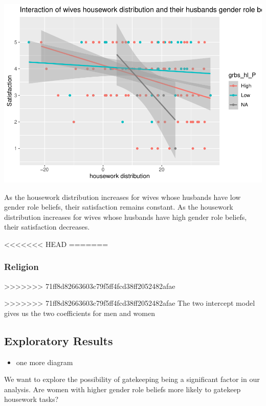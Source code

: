\documentclass[
  man,floatsintext]{apa6}
\providecommand{\tightlist}{%
  \setlength{\itemsep}{0pt}\setlength{\parskip}{0pt}}
\begin{document}
\includegraphics{results_files/figure-latex/unnamed-chunk-10-1.pdf}

As the housework distribution increases for wives whose husbands have low gender role beliefs, their satisfaction remains constant. As the housework distribution increases for wives whose husbands have high gender role beliefs, their satisfaction decreases.

<<<<<<< HEAD
=======
\hypertarget{religion}{%
\subsubsection{Religion}\label{religion}}
>>>>>>> 71ff8d82663603c79f5ff4fcd38ff2052482afae

>>>>>>> 71ff8d82663603c79f5ff4fcd38ff2052482afae
The two intercept model gives us the two coefficients for men and women

\hypertarget{exploratory-results}{%
\subsection{Exploratory Results}\label{exploratory-results}}

\begin{itemize}
\tightlist
\item
  one more diagram
\end{itemize}

We want to explore the possibility of gatekeeping being a significant factor in our analysis. Are women with higher gender role beliefs more likely to gatekeep housework tasks?


\clearpage
\renewcommand{\listfigurename}{Figure captions}

\clearpage
\renewcommand{\listtablename}{Table captions}
\end{document}
